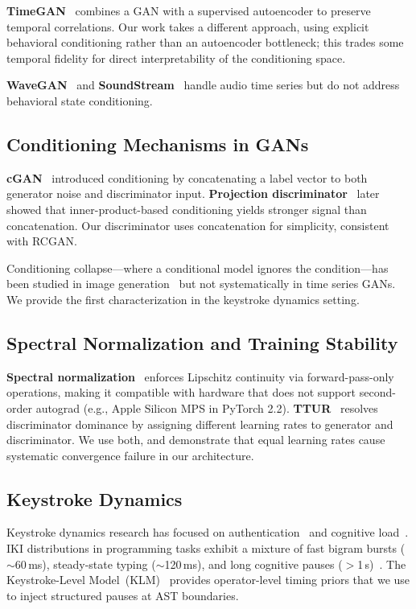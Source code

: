 \documentclass[sigconf,nonacm]{acmart}
\begin{document}
\textbf{TimeGAN}~\cite{yoon2019timegan} combines a GAN with a supervised
autoencoder to preserve temporal correlations.
Our work takes a different approach, using explicit behavioral conditioning
rather than an autoencoder bottleneck; this trades some temporal fidelity
for direct interpretability of the conditioning space.

\textbf{WaveGAN}~\cite{donahue2018wavegan} and
\textbf{SoundStream}~\cite{zeghidour2021soundstream} handle audio time series
but do not address behavioral state conditioning.

\subsection{Conditioning Mechanisms in GANs}

\textbf{cGAN}~\cite{mirza2014cgan} introduced conditioning by concatenating
a label vector to both generator noise and discriminator input.
\textbf{Projection discriminator}~\cite{miyato2018projection} later showed
that inner-product-based conditioning yields stronger signal than concatenation.
Our discriminator uses concatenation for simplicity, consistent with RCGAN.

Conditioning collapse---where a conditional model ignores the condition---has
been studied in image generation~\cite{shen2020interpreting} but not
systematically in time series GANs.
We provide the first characterization in the keystroke dynamics setting.

\subsection{Spectral Normalization and Training Stability}

\textbf{Spectral normalization}~\cite{miyato2018spectral} enforces Lipschitz
continuity via forward-pass-only operations, making it compatible with
hardware that does not support second-order autograd (e.g., Apple Silicon MPS
in PyTorch 2.2).
\textbf{TTUR}~\cite{heusel2017ttur} resolves discriminator dominance by
assigning different learning rates to generator and discriminator.
We use both, and demonstrate that equal learning rates cause systematic
convergence failure in our architecture.

\subsection{Keystroke Dynamics}

Keystroke dynamics research has focused on authentication~\cite{majaranta2009typing}
and cognitive load~\cite{leiva2021typing}.
IKI distributions in programming tasks exhibit a mixture of fast bigram bursts
($\sim$60\,ms), steady-state typing ($\sim$120\,ms), and long cognitive pauses
($>$1\,s)~\cite{leinonen2019cs1}.
The Keystroke-Level Model~(KLM)~\cite{card1980klm} provides operator-level
timing priors that we use to inject structured pauses at AST boundaries.
\end{document}
